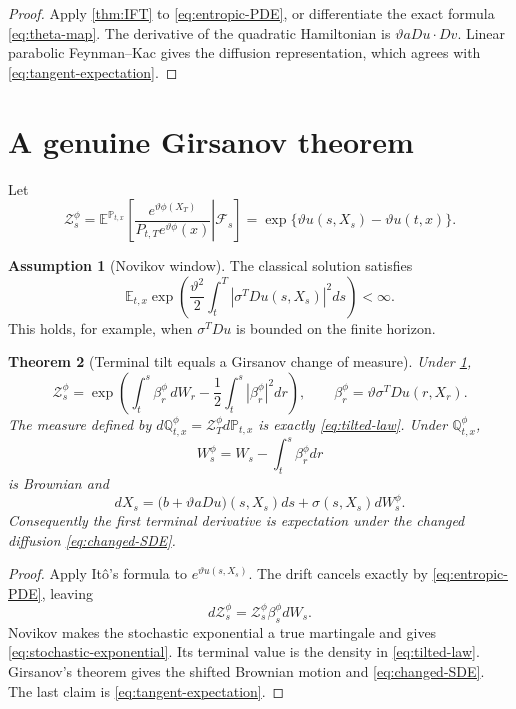 \documentclass[11pt,reqno]{amsart}
\newtheorem{theorem}{Theorem}[section]
\theoremstyle{definition}
\newtheorem{assumption}[theorem]{Assumption}
\theoremstyle{remark}
\newcommand{\E}{\mathbb E}
\newcommand{\F}{\mathcal F}
\newcommand{\Pp}{\mathbb P}
\newcommand{\Qp}{\mathbb Q}
\newcommand{\abs}[1]{\left\lvert #1\right\rvert}
\begin{document}
\begin{proof}
Apply \cref{thm:IFT} to \eqref{eq:entropic-PDE}, or differentiate the exact
formula \eqref{eq:theta-map}.  The derivative of the quadratic Hamiltonian is
$\vartheta aDu\cdot Dv$.  Linear parabolic Feynman--Kac gives the diffusion
representation, which agrees with \eqref{eq:tangent-expectation}.
\end{proof}

\section{A genuine Girsanov theorem}\label{sec:Girsanov}

Let
\begin{equation}\label{eq:density-process}
 \mathcal Z_s^{\phi}
 =\E^{\Pp_{t,x}}
 \left[\left.
 \frac{e^{\vartheta\phi(X_T)}}
 {P_{t,T}e^{\vartheta\phi}(x)}
 \right|\F_s\right]
 =\exp\{\vartheta u(s,X_s)-\vartheta u(t,x)\}.
\end{equation}

\begin{assumption}[Novikov window]\label{ass:Novikov}
The classical solution satisfies
\[
 \E_{t,x}\exp\left(
 \frac{\vartheta^2}{2}
 \int_t^T\abs{\sigma^TDu(s,X_s)}^2ds
 \right)<\infty.
\]
This holds, for example, when $\sigma^TDu$ is bounded on the finite horizon.
\end{assumption}

\begin{theorem}[Terminal tilt equals a Girsanov change of measure]\label{thm:Girsanov}
Under \cref{ass:Novikov},
\begin{equation}\label{eq:stochastic-exponential}
 \mathcal Z_s^{\phi}
 =\exp\left(
 \int_t^s\beta_r^{\phi}\,dW_r
 -\frac12\int_t^s\abs{\beta_r^{\phi}}^2dr
 \right),
 \qquad
 \beta_r^{\phi}=\vartheta\sigma^TDu(r,X_r).
\end{equation}
The measure defined by
$d\Qp_{t,x}^{\phi}=\mathcal Z_T^{\phi}d\Pp_{t,x}$ is exactly
\eqref{eq:tilted-law}.  Under $\Qp_{t,x}^{\phi}$,
\[
 W_s^{\phi}=W_s-\int_t^s\beta_r^{\phi}dr
\]
is Brownian and
\begin{equation}\label{eq:changed-SDE}
 dX_s=\bigl(b+\vartheta aDu\bigr)(s,X_s)ds
 +\sigma(s,X_s)dW_s^{\phi}.
\end{equation}
Consequently the first terminal derivative is expectation under the changed
diffusion \eqref{eq:changed-SDE}.
\end{theorem}

\begin{proof}
Apply It\^o's formula to $e^{\vartheta u(s,X_s)}$.  The drift cancels exactly
by \eqref{eq:entropic-PDE}, leaving
\[
 d\mathcal Z_s^{\phi}
 =\mathcal Z_s^{\phi}\beta_s^{\phi}dW_s.
\]
Novikov makes the stochastic exponential a true martingale and gives
\eqref{eq:stochastic-exponential}.  Its terminal value is the density in
\eqref{eq:tilted-law}.  Girsanov's theorem gives the shifted Brownian motion
and \eqref{eq:changed-SDE}.  The last claim is
\eqref{eq:tangent-expectation}.
\end{proof}
\end{document}
